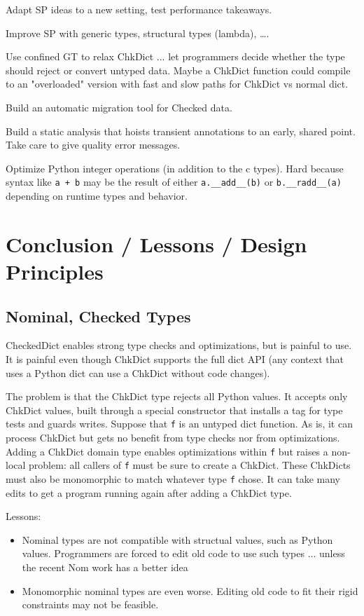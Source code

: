 \documentclass[english,cleveref,submission]{programming}
\newcommand{\code}[1]{\texttt{#1}}
\begin{document}
Adapt SP ideas to a new setting, test performance takeaways.

Improve SP with generic types, structural types (lambda), \ldots.

Use confined GT to relax ChkDict ... let programmers decide whether
the type should reject or convert untyped data.
Maybe a ChkDict function could compile to an "overloaded" version with
fast and slow paths for ChkDict vs normal dict.

Build an automatic migration tool for Checked data.

Build a static analysis that hoists transient annotations to an early, shared point.
Take care to give quality error messages.

Optimize Python integer operations (in addition to the c types).
Hard because syntax like \code{a + b} may be the result of either \code{a.\_\_add\_\_(b)}
or \code{b.\_\_radd\_\_(a)} depending on runtime types and behavior.


\section{Conclusion / Lessons / Design Principles}
\label{s:conclusion}


\subsection{Nominal, Checked Types}
\label{s:concrete-migration}

CheckedDict enables strong type checks and optimizations, but is painful to use.
It is painful even though ChkDict supports the full dict API
(any context that uses a Python dict can use a ChkDict without code changes).

The problem is that the ChkDict type rejects all Python values.
It accepts only ChkDict values, built through a special constructor
that installs a tag for type tests and guards writes.
Suppose that \code{f} is an untyped dict function.
As is, it can process ChkDict but gets no benefit from type checks nor from optimizations.
Adding a ChkDict domain type enables optimizations within \code{f} but raises a non-local
problem: all callers of \code{f} must be sure to create a ChkDict.
These ChkDicts must also be monomorphic to match whatever type \code{f} chose.
It can take many edits to get a program running again after adding a ChkDict type.

Lessons:
\begin{itemize}
  \item
    Nominal types are not compatible with structual values, such as Python values.
    Programmers are forced to edit old code to use such types ... unless the recent Nom work has a better idea~\cite{mt-oopsla-2021}
  \item
    Monomorphic nominal types are even worse.
    Editing old code to fit their rigid constraints may not be feasible.

\end{itemize}
\end{document}
